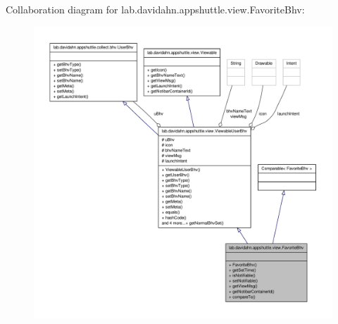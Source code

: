 \-Collaboration diagram for lab.\-davidahn.\-appshuttle.\-view.\-Favorite\-Bhv\-:
\nopagebreak
\begin{figure}[H]
\begin{center}
\leavevmode
\includegraphics[width=350pt]{classlab_1_1davidahn_1_1appshuttle_1_1view_1_1_favorite_bhv__coll__graph}
\end{center}
\end{figure}
